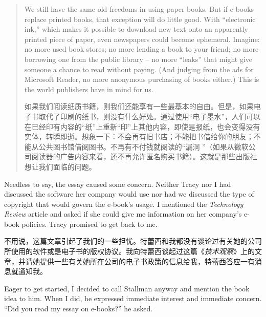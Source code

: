 \begin{quote}
\ifdefined\eng
We still have the same old freedoms in using paper books. But if e-books replace printed books, that exception will do little good. With ``electronic ink,'' which makes it possible to download new text onto an apparently printed piece of paper, even newspapers could become ephemeral. Imagine: no more used book stores; no more lending a book to your friend; no more borrowing one from the public library -- no more ``leaks'' that might give someone a chance to read without paying. (And judging from the ads for Microsoft Reader, no more anonymous purchasing of books either.) This is the world publishers have in mind for us.
\fi

\ifdefined\chs
如果我们阅读纸质书籍，则我们还能享有一些最基本的自由。但是，如果电子书取代了印刷的纸书，则没有什么好处。通过使用``电子墨水''，人们可以在已经印有内容的``纸''上重新``印''上其他内容，即使是报纸，也会变得没有实体，转瞬即逝。想象一下：不会再有旧书店；不能把书借给你的朋友；不能从公共图书馆借阅图书。不再有不付钱就阅读的``漏洞 ''（如果从微软公司阅读器的广告内容来看，还不再允许匿名购买书籍）。这就是那些出版社想让我们面临的问题。
\fi
\end{quote}

\ifdefined\eng
Needless to say, the essay caused some concern. Neither Tracy nor I had discussed the software her company would use nor had we discussed the type of copyright \ifdefined\vtwo [license] \fi that would govern the e-book's usage. I mentioned the \textit{Technology Review} article and asked if she could give me information on her company's e-book policies. Tracy promised to get back to me.
\fi

\ifdefined\chs
不用说，这篇文章引起了我们的一些担忧。特蕾西和我都没有谈论过有关她的公司所使用的软件或是电子书的版权协议\ifdefined\vtwo [许可证]。我向特蕾西谈起过这篇《\textit{技术观察}》上的文章，并请她提供一些有关她所在公司的电子书政策的信息给我，特蕾西答应一有消息就通知我。
\fi

\ifdefined\eng
Eager to get started, I decided to call Stallman anyway and mention the book idea to him. When I did, he expressed immediate interest and immediate concern. ``Did you read my essay on e-books?'' he asked.
\fi

